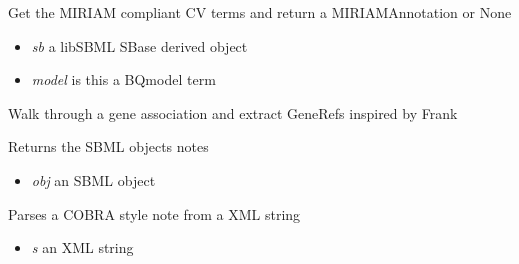 \documentclass[a4paper,11pt,english]{sphinxmanual}
\begin{document}

\begin{fulllineitems}
\label{modules_doc:cbmpy.CBXML.sbml_getCVterms}
Get the MIRIAM compliant CV terms and return a MIRIAMAnnotation or None
\begin{itemize}
\item {} 
\emph{sb} a libSBML SBase derived object

\item {} 
\emph{model} is this a BQmodel term

\end{itemize}

\end{fulllineitems}


\begin{fulllineitems}
\label{modules_doc:cbmpy.CBXML.sbml_getGeneRefs}
Walk through a gene association and extract GeneRefs inspired by Frank

\end{fulllineitems}


\begin{fulllineitems}
\label{modules_doc:cbmpy.CBXML.sbml_getNotes}
Returns the SBML objects notes
\begin{itemize}
\item {} 
\emph{obj} an SBML object

\end{itemize}

\end{fulllineitems}


\begin{fulllineitems}
\label{modules_doc:cbmpy.CBXML.sbml_readCOBRANote}
Parses a COBRA style note from a XML string
\begin{itemize}
\item {} 
\emph{s} an XML string

\end{itemize}

\end{fulllineitems}
\end{document}
